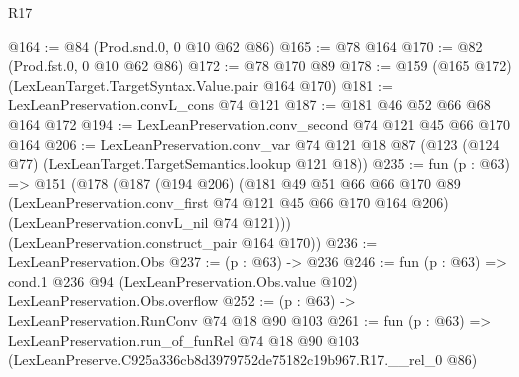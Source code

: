 \begin{lexlean}{R17}
\begin{coremodule}
@164 := @84 (Prod.snd.{0, 0} @10 @62 @86)
@165 := @78 @164
@170 := @82 (Prod.fst.{0, 0} @10 @62 @86)
@172 := @78 @170 @89
@178 := @159 (@165 @172) (LexLeanTarget.TargetSyntax.Value.pair @164 @170)
@181 := LexLeanPreservation.convL_cons @74 @121
@187 := @181 @46 @52 @66 @68 @164 @172
@194 := LexLeanPreservation.conv_second @74 @121 @45 @66 @170 @164
@206 := LexLeanPreservation.conv_var
    @74
    @121
    @18
    @87
    (@123 (@124 @77) (LexLeanTarget.TargetSemantics.lookup @121 @18))
@235 := fun (p : @63) =>
  @151
    (@178
      (@187
        (@194 @206)
        (@181
          @49
          @51
          @66
          @66
          @170
          @89
          (LexLeanPreservation.conv_first @74 @121 @45 @66 @170 @164 @206)
          (LexLeanPreservation.convL_nil @74 @121)))
      (LexLeanPreservation.construct_pair @164 @170))
@236 := LexLeanPreservation.Obs
@237 := (p : @63) -> @236
@246 := fun (p : @63) =>
  cond.{1} @236 @94 (LexLeanPreservation.Obs.value @102) LexLeanPreservation.Obs.overflow
@252 := (p : @63) -> LexLeanPreservation.RunConv @74 @18 @90 @103
@261 := fun (p : @63) =>
  LexLeanPreservation.run_of_funRel
    @74
    @18
    @90
    @103
    (LexLeanPreserve.C925a336cb8d3979752de75182c19b967.R17.__rel_0 @86)
\end{coremodule}
\end{lexlean}
